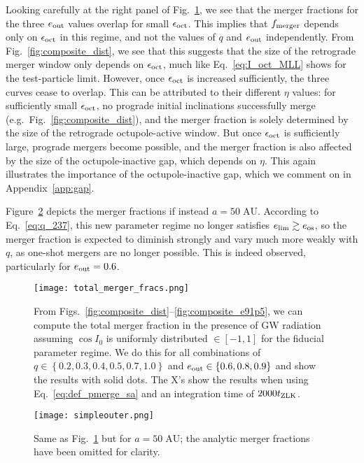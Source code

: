 \documentclass[
        fleqn,
        usenatbib,
    ]{mnras}
\newcommand*{\z}[1]{\left\{#1\right\}}
\begin{document}
Looking carefully at the right panel of Fig.~\ref{fig:total_merger_fracs}, we
see that the merger fractions for the three $e_{\rm out}$ values overlap for
small $\epsilon_{\rm oct}$. This implies that $f_{\rm merger}$ depends only on
$\epsilon_{\rm oct}$ in this regime, and not the values of $q$ and $e_{\rm out}$
independently. From Fig.~\ref{fig:composite_dist}, we see that this suggests
that the size of the retrograde merger window only depends on $\epsilon_{\rm
oct}$, much like Eq.~\eqref{eq:I_oct_MLL} shows for the test-particle limit.
However, once $\epsilon_{\rm oct}$ is increased sufficiently, the three curves
cease to overlap. This can be attributed to their different $\eta$ values: for
sufficiently small $\epsilon_{\rm oct}$, no prograde initial inclinations
successfully merge (e.g.\ Fig.~\ref{fig:composite_dist}), and the merger
fraction is solely determined by the size of the retrograde octupole-active
window. But once $\epsilon_{\rm oct}$ is sufficiently large, prograde mergers
become possible, and the merger fraction is also affected by the size of the
octupole-inactive gap, which depends on $\eta$. This again illustrates the
importance of the octupole-inactive gap, which we comment on in
Appendix~\ref{app:gap}.

Figure~\ref{fig:sweepbin_simpleouter} depicts the merger fractions if instead $a
= 50\;\mathrm{AU}$. According to Eq.~\eqref{eq:q_237}, this new parameter regime
no longer satisfies $e_{\lim} \gtrsim e_{\rm os}$, so the merger fraction is
expected to diminish strongly and vary much more weakly with $q$, as one-shot
mergers are no longer possible. This is indeed observed, particularly for
$e_{\rm out} = 0.6$.

\begin{figure*}
    \centering
    \texttt{[image: total\_merger\_fracs.png]}
    \caption{From Figs.~\ref{fig:composite_dist}--\ref{fig:composite_e91p5}, we
    can compute the total merger fraction in the presence of GW radiation
    assuming $\cos I_0$ is uniformly distributed $\in [-1, 1]$ for the fiducial
    parameter regime. We do this for all combinations of $q \in \z{0.2, 0.3,
    0.4, 0.5, 0.7, 1.0}$ and $e_{\rm out} \in \z{0.6, 0.8, 0.9}$ and show the
    results with solid dots. The X's show the results when using
    Eq.~\eqref{eq:def_pmerge_sa} and an integration time of $2000 t_{\rm ZLK}$.
    }\label{fig:total_merger_fracs}
\end{figure*}
\begin{figure*}
    \centering
    \texttt{[image: simpleouter.png]}
    \caption{Same as Fig.~\ref{fig:total_merger_fracs} but for $a =
    50\;\mathrm{AU}$; the analytic merger fractions have been omitted for
    clarity.
    }\label{fig:sweepbin_simpleouter}
\end{figure*}
\end{document}
